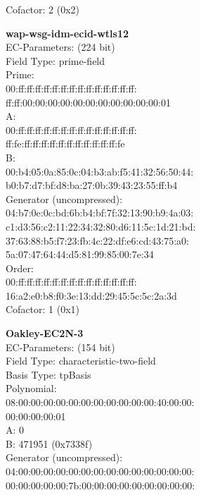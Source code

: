 Cofactor:  2 (0x2)\\
\item \textbf{ wap-wsg-idm-ecid-wtls12 }\\
EC-Parameters: (224 bit)\\
Field Type: prime-field\\
Prime:\\
    00:ff:ff:ff:ff:ff:ff:ff:ff:ff:ff:ff:ff:ff:ff:\\
    ff:ff:00:00:00:00:00:00:00:00:00:00:00:01\\
A:   \\
    00:ff:ff:ff:ff:ff:ff:ff:ff:ff:ff:ff:ff:ff:ff:\\
    ff:fe:ff:ff:ff:ff:ff:ff:ff:ff:ff:ff:ff:fe\\
B:   \\
    00:b4:05:0a:85:0c:04:b3:ab:f5:41:32:56:50:44:\\
    b0:b7:d7:bf:d8:ba:27:0b:39:43:23:55:ff:b4\\
Generator (uncompressed):\\
    04:b7:0e:0c:bd:6b:b4:bf:7f:32:13:90:b9:4a:03:\\
    c1:d3:56:c2:11:22:34:32:80:d6:11:5c:1d:21:bd:\\
    37:63:88:b5:f7:23:fb:4c:22:df:e6:cd:43:75:a0:\\
    5a:07:47:64:44:d5:81:99:85:00:7e:34\\
Order: \\
    00:ff:ff:ff:ff:ff:ff:ff:ff:ff:ff:ff:ff:ff:ff:\\
    16:a2:e0:b8:f0:3e:13:dd:29:45:5c:5c:2a:3d\\
Cofactor:  1 (0x1)\\
\item \textbf{ Oakley-EC2N-3 }\\
EC-Parameters: (154 bit)\\
Field Type: characteristic-two-field\\
Basis Type: tpBasis\\
Polynomial:\\
    08:00:00:00:00:00:00:00:00:00:00:00:40:00:00:\\
    00:00:00:00:01\\
A:    0\\
B:    471951 (0x7338f)\\
Generator (uncompressed):\\
    04:00:00:00:00:00:00:00:00:00:00:00:00:00:00:\\
    00:00:00:00:00:7b:00:00:00:00:00:00:00:00:00:\\

